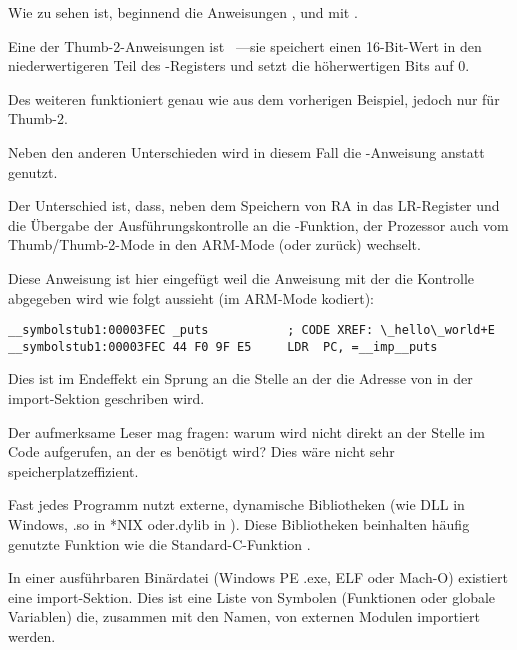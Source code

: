 
Wie zu sehen ist, beginnend die Anweisungen ,  und  mit .

Eine der Thumb-2-Anweisungen ist  ~---sie speichert einen 16-Bit-Wert in den
niederwertigeren Teil des -Registers und setzt die höherwertigen Bits auf 0.

Des weiteren funktioniert  genau wie  aus dem vorherigen Beispiel,
jedoch nur für Thumb-2.


Neben den anderen Unterschieden wird in diesem Fall die -Anweisung anstatt  genutzt.

Der Unterschied ist, dass, neben dem Speichern von \ac{RA} in das \ac{LR}-Register und die Übergabe
der Ausführungskontrolle an die \puts-Funktion, der Prozessor auch vom Thumb/Thumb-2-Mode in den
ARM-Mode (oder zurück) wechselt.

Diese Anweisung ist hier eingefügt weil die Anweisung mit der die Kontrolle abgegeben wird wie folgt
aussieht (im ARM-Mode kodiert):

\begin{lstlisting}[style=customasmARM]
__symbolstub1:00003FEC _puts           ; CODE XREF: \_hello\_world+E
__symbolstub1:00003FEC 44 F0 9F E5     LDR  PC, =__imp__puts
\end{lstlisting}

Dies ist im Endeffekt ein Sprung an die Stelle an der die Adresse von \puts in der import-Sektion geschriben wird.

Der aufmerksame Leser mag fragen: warum wird \puts nicht direkt an der Stelle im Code aufgerufen,
an der es benötigt wird? Dies wäre nicht sehr speicherplatzeffizient.

Fast jedes Programm nutzt externe, dynamische Bibliotheken (wie DLL in Windows, .so in *NIX oder.dylib in \MacOSX).
Diese Bibliotheken beinhalten häufig genutzte Funktion wie die Standard-C-Funktion \puts.

In einer ausführbaren Binärdatei (Windows PE .exe, ELF oder Mach-O) existiert eine import-Sektion.
Dies ist eine Liste von Symbolen (Funktionen oder globale Variablen) die, zusammen mit den Namen, von
externen Modulen importiert werden.

